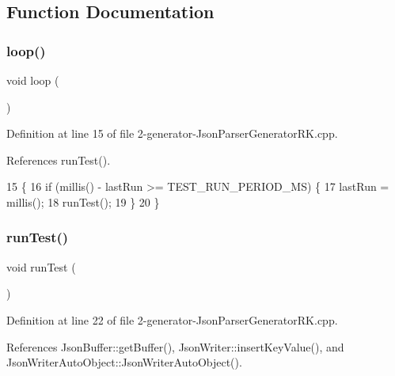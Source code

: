 \subsection{Function Documentation}
\mbox{\label{2-generator-_json_parser_generator_r_k_8cpp_afe461d27b9c48d5921c00d521181f12f}} 
\subsubsection{loop()}
{\footnotesize\ttfamily void loop (\begin{DoxyParamCaption}{ }\end{DoxyParamCaption})}



Definition at line 15 of file 2-\/generator-\/\+Json\+Parser\+Generator\+R\+K.\+cpp.



References run\+Test().


\begin{DoxyCode}
15             \{
16     \textcolor{keywordflow}{if} (millis() - lastRun >= TEST_RUN_PERIOD_MS) \{
17         lastRun = millis();
18         runTest();
19     \}
20 \}
\end{DoxyCode}
\mbox{\label{2-generator-_json_parser_generator_r_k_8cpp_a822f652c6fc2f163c182a6e5fe922c23}} 
\subsubsection{run\+Test()}
{\footnotesize\ttfamily void run\+Test (\begin{DoxyParamCaption}{ }\end{DoxyParamCaption})}



Definition at line 22 of file 2-\/generator-\/\+Json\+Parser\+Generator\+R\+K.\+cpp.



References Json\+Buffer\+::get\+Buffer(), Json\+Writer\+::insert\+Key\+Value(), and Json\+Writer\+Auto\+Object\+::\+Json\+Writer\+Auto\+Object().



